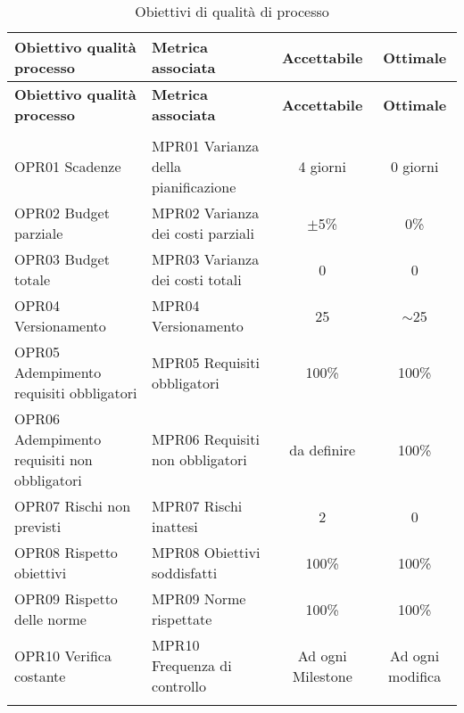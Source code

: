 \documentclass[../piano_di_qualifica.tex]{subfiles}
\begin{document}
\begin{center}
	\begin{longtable}{|p{4.5cm}|p{5cm}|c|c|}
		\hline
		\rowcolor{lightgray}
		{\textbf{Obiettivo qualità processo}} & {\textbf{Metrica associata}} & {\textbf{Accettabile}} & {\textbf{Ottimale}} \\
		\hline
		\endfirsthead
	
		\hline
		\rowcolor{lightgray}
		{\textbf{Obiettivo qualità processo}} & {\textbf{Metrica associata}} & {\textbf{Accettabile}} & {\textbf{Ottimale}} \\
		\hline
		\endhead
		
		\hline
		\rowcolor{white}
		\multicolumn{4}{|c|}{\emph{Continua alla pagina successiva...}}\\
		\hline
		\endfoot
		\endlastfoot

		OPR01 Scadenze                              & MPR01 Varianza della pianificazione 	& 4 giorni             	& 0 giorni             	\\
		OPR02 Budget parziale                       & MPR02 Varianza dei costi parziali   	& $\pm$5\%             	& 0\%                  	\\
		OPR03 Budget totale							& MPR03 Varianza dei costi totali	  	& 0						& 0						\\
		OPR04 Versionamento							& MPR04 Versionamento					& 25					& $\sim$25				\\
		OPR05 Adempimento requisiti obbligatori     & MPR05 Requisiti obbligatori         	& 100\%                	& 100\%                	\\
		OPR06 Adempimento requisiti non obbligatori & MPR06 Requisiti non obbligatori     	& da definire          	& 100\%                	\\
		OPR07 Rischi non previsti 					& MPR07 Rischi inattesi					& 2						& 0						\\
		OPR08 Rispetto obiettivi                    & MPR08 Obiettivi soddisfatti         	& 100\%                	& 100\%                	\\
		OPR09 Rispetto delle norme                  & MPR09 Norme rispettate              	& 100\%                	& 100\%                	\\
		OPR10 Verifica costante                     & MPR10 Frequenza di controllo        	& Ad ogni Milestone    	& Ad ogni modifica     	\\
		\hline
		\rowcolor{white}
		\caption{Obiettivi di qualità di processo}
	\end{longtable}
\end{center}
\end{document}
